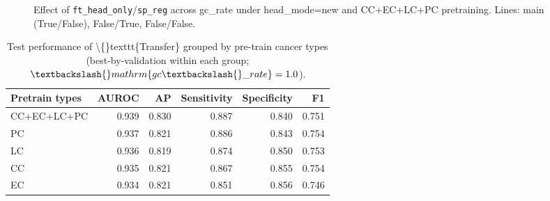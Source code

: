 \documentclass[diagnostics,article,submit,pdftex,moreauthors]{Definitions/mdpi}
\begin{document}
\newcommand{\oldDir}{old/tex_and_figs folders/020-tex_and_figs}

\begin{figure}[H]
\centering
{}
\\
\\
\caption{Effect of \texttt{ft\_head\_only}/\texttt{sp\_reg} across gc\_rate under head\_mode=new and CC+EC+LC+PC pretraining. Lines: main (True/False), False/True, False/False.}
\label{fig:transfer-combo-gcrate}
\end{figure}








\begin{table}[t]
\centering
\small
\begin{tabular}{lrrrrr}
\toprule
Pretrain types & AUROC & AP & Sensitivity & Specificity & F1 \\
\midrule
CC+EC+LC+PC & 0.939 & 0.830 & 0.887 & 0.840 & 0.751 \\
PC & 0.937 & 0.821 & 0.886 & 0.843 & 0.754 \\
LC & 0.936 & 0.819 & 0.874 & 0.850 & 0.753 \\
CC & 0.935 & 0.821 & 0.867 & 0.855 & 0.754 \\
EC & 0.934 & 0.821 & 0.851 & 0.856 & 0.746 \\
\bottomrule
\end{tabular}

\caption{Test performance of \textbackslash\{\}texttt\{Transfer\} grouped by pre-train cancer types (best-by-validation within each group; $\textbackslash\{\}mathrm\{gc\textbackslash\{\}\_rate\}=1.0$).}
\label{tab:transfer-by-pretrain-types}
\end{table}
\end{document}
